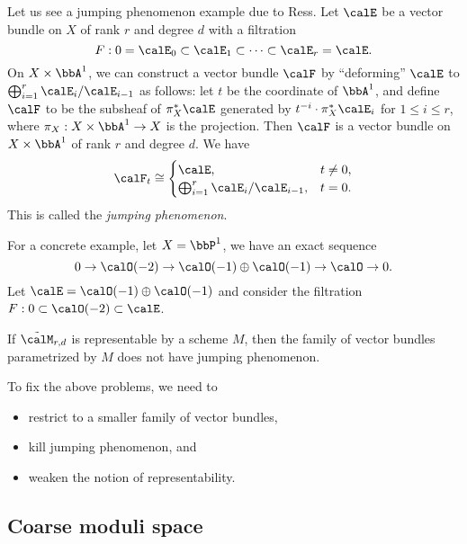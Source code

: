     \begin{example}\label{eg:Ress_construction}
        Let us see a jumping phenomenon example due to Ress.
        Let \(\calE\) be a vector bundle on \(X\) of rank \(r\) and degree \(d\) with a filtration
        \[F: 0 = \calE_0 \subset \calE_1 \subset \cdots \subset \calE_r = \calE. \]
        On \(X \times \bbA^1\), we can construct a vector bundle \(\calF\) by ``deforming'' \(\calE\) to \(\bigoplus_{i=1}^r \calE_i/\calE_{i-1}\) as follows:
        let \(t\) be the coordinate of \(\bbA^1\), 
        and define \(\calF\) to be the subsheaf of \(\pi_X^* \calE\) generated by \(t^{-i} \cdot \pi_X^* \calE_i\) for \(1 \leq i \leq r\), where \(\pi_X : X \times \bbA^1 \to X\) is the projection.
        Then \(\calF\) is a vector bundle on \(X \times \bbA^1\) of rank \(r\) and degree \(d\).
        We have 
        \[ \calF_t \cong \begin{cases}
            \calE, & t \neq 0, \\
            \bigoplus_{i=1}^r \calE_i/\calE_{i-1}, & t = 0.
        \end{cases} \]
        This is called the \emph{jumping phenomenon}.

        For a concrete example, let \(X = \bbP^1\), we have an exact sequence
        \[ 0 \to \calO(-2) \to \calO(-1) \oplus \calO(-1) \to \calO \to 0. \]
        Let \(\calE = \calO(-1) \oplus \calO(-1)\) and consider the filtration \(F : 0 \subset \calO(-2) \subset \calE\).
    \end{example}

    If \(\tilde{\calM}_{r,d}\) is representable by a scheme \(M\), then the family of vector bundles parametrized by \(M\) does not have jumping phenomenon.

    To fix the above problems, we need to 
    \begin{itemize}
        \item restrict to a smaller family of vector bundles,
        \item kill jumping phenomenon, and
        \item weaken the notion of representability.
    \end{itemize}

\subsection{Coarse moduli space}

